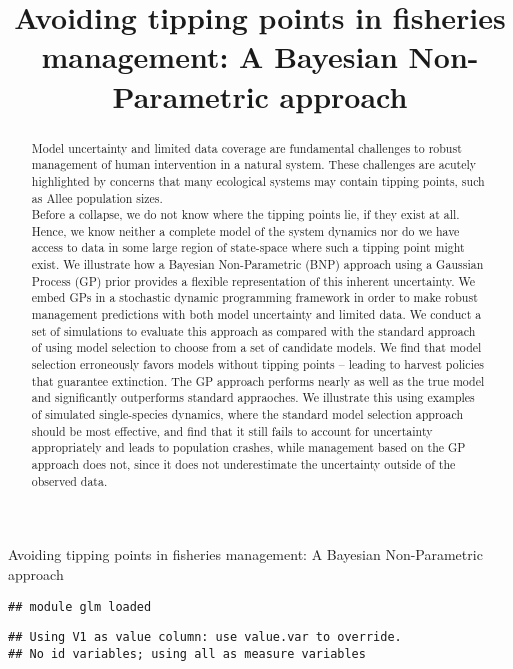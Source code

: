 \documentclass[]{components/elsarticle}
\title{Avoiding tipping points in fisheries management: A Bayesian
Non-Parametric approach}
\author{ \and  \and }
\date{}
\begin{document}
\begin{center}
\huge Avoiding tipping points in fisheries management: A Bayesian
Non-Parametric approach \\[0.2cm]
\normalsize
\end{center}

\begin{abstract}
Model uncertainty and limited data coverage are fundamental challenges
to robust management of human intervention in a natural system. These
challenges are acutely highlighted by concerns that many ecological
systems may contain tipping points, such as Allee population
sizes.\\Before a collapse, we do not know where the tipping points lie,
if they exist at all. Hence, we know neither a complete model of the
system dynamics nor do we have access to data in some large region of
state-space where such a tipping point might exist. We illustrate how a
Bayesian Non-Parametric (BNP) approach using a Gaussian Process (GP)
prior provides a flexible representation of this inherent uncertainty.
We embed GPs in a stochastic dynamic programming framework in order to
make robust management predictions with both model uncertainty and
limited data. We conduct a set of simulations to evaluate this approach
as compared with the standard approach of using model selection to
choose from a set of candidate models. We find that model selection
erroneously favors models without tipping points -- leading to harvest
policies that guarantee extinction. The GP approach performs nearly as
well as the true model and significantly outperforms standard
appraoches. We illustrate this using examples of simulated
single-species dynamics, where the standard model selection approach
should be most effective, and find that it still fails to account for
uncertainty appropriately and leads to population crashes, while
management based on the GP approach does not, since it does not
underestimate the uncertainty outside of the observed data.
\end{abstract}

\begin{verbatim}
## module glm loaded
\end{verbatim}

\begin{verbatim}
## Using V1 as value column: use value.var to override.
## No id variables; using all as measure variables
\end{verbatim}
\end{document}
